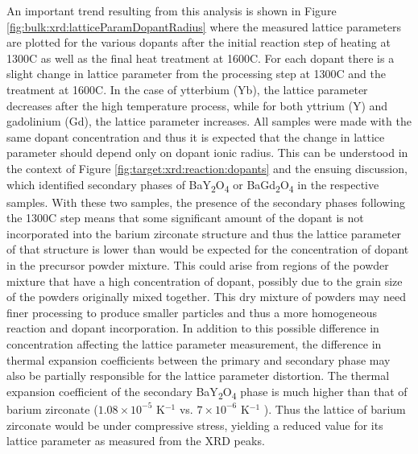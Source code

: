 An important trend resulting from this analysis is shown in Figure \ref{fig:bulk:xrd:latticeParamDopantRadius} where the measured lattice parameters are plotted for the various dopants after the initial reaction step of heating at 1300\textdegree C as well as the final heat treatment at 1600\textdegree C. For each dopant there is a slight change in lattice parameter from the processing step at 1300\textdegree C and the treatment at 1600\textdegree C. In the case of ytterbium (Yb), the lattice parameter decreases after the high temperature process, while for both yttrium (Y) and gadolinium (Gd), the lattice parameter increases. All samples were made with the same dopant concentration and thus it is expected that the change in lattice parameter should depend only on dopant ionic radius. This can be understood in the context of Figure \ref{fig:target:xrd:reaction:dopants} and the ensuing discussion, which identified secondary phases of BaY\textsubscript{2}O\textsubscript{4} or BaGd\textsubscript{2}O\textsubscript{4} in the respective samples. With these two samples, the presence of the secondary phases following the 1300\textdegree C step means that some significant amount of the dopant is not incorporated into the barium zirconate structure and thus the lattice parameter of that structure is lower than would be expected for the concentration of dopant in the precursor powder mixture. This could arise from regions of the powder mixture that have a high concentration of dopant, possibly due to the grain size of the powders originally mixed together. This dry mixture of powders may need finer processing to produce smaller particles and thus a more homogeneous reaction and dopant incorporation. In addition to this possible difference in concentration affecting the lattice parameter measurement, the difference in thermal expansion coefficients between the primary and secondary phase may also be partially responsible for the lattice parameter distortion. The thermal expansion coefficient of the secondary BaY\textsubscript{2}O\textsubscript{4} phase is much higher than that of barium zirconate ($1.08\times 10^{-5}$ K$^{-1}$ vs. $7\times 10^{-6}$ K$^{-1}$ \cite{Maekawa2007, Zhao1991, Goretta1998, Yamanaka2005}). Thus the lattice of barium zirconate would be under compressive stress, yielding a reduced value for its lattice parameter as measured from the XRD peaks. 

